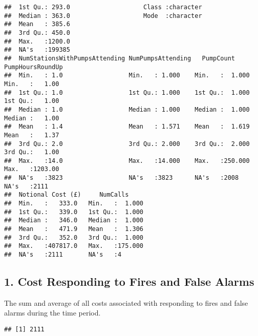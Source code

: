 \documentclass[
]{article}
\newenvironment{Shaded}{\begin{snugshade}}{\end{snugshade}}
\newcommand{\AttributeTok}[1]{\textcolor[rgb]{0.77,0.63,0.00}{#1}}
\newcommand{\FunctionTok}[1]{\textcolor[rgb]{0.00,0.00,0.00}{#1}}
\newcommand{\NormalTok}[1]{#1}
\newcommand{\SpecialCharTok}[1]{\textcolor[rgb]{0.00,0.00,0.00}{#1}}
\newcommand{\StringTok}[1]{\textcolor[rgb]{0.31,0.60,0.02}{#1}}
\begin{document}
\begin{verbatim}
##  1st Qu.: 293.0                    Class :character                      
##  Median : 363.0                    Mode  :character                      
##  Mean   : 385.6                                                          
##  3rd Qu.: 450.0                                                          
##  Max.   :1200.0                                                          
##  NA's   :199385                                                          
##  NumStationsWithPumpsAttending NumPumpsAttending   PumpCount       PumpHoursRoundUp 
##  Min.   : 1.0                  Min.   : 1.000    Min.   :  1.000   Min.   :   1.00  
##  1st Qu.: 1.0                  1st Qu.: 1.000    1st Qu.:  1.000   1st Qu.:   1.00  
##  Median : 1.0                  Median : 1.000    Median :  1.000   Median :   1.00  
##  Mean   : 1.4                  Mean   : 1.571    Mean   :  1.619   Mean   :   1.37  
##  3rd Qu.: 2.0                  3rd Qu.: 2.000    3rd Qu.:  2.000   3rd Qu.:   1.00  
##  Max.   :14.0                  Max.   :14.000    Max.   :250.000   Max.   :1203.00  
##  NA's   :3823                  NA's   :3823      NA's   :2008      NA's   :2111     
##  Notional Cost (£)     NumCalls      
##  Min.   :   333.0   Min.   :  1.000  
##  1st Qu.:   339.0   1st Qu.:  1.000  
##  Median :   346.0   Median :  1.000  
##  Mean   :   471.9   Mean   :  1.306  
##  3rd Qu.:   352.0   3rd Qu.:  1.000  
##  Max.   :407817.0   Max.   :175.000  
##  NA's   :2111       NA's   :4
\end{verbatim}

\hypertarget{cost-responding-to-fires-and-false-alarms}{%
\subsection{1. Cost Responding to Fires and False
Alarms}\label{cost-responding-to-fires-and-false-alarms}}

The sum and average of all costs associated with responding to fires and
false alarms during the time period.

\begin{Shaded}
\end{Shaded}

\begin{verbatim}
## [1] 2111
\end{verbatim}
\end{document}
